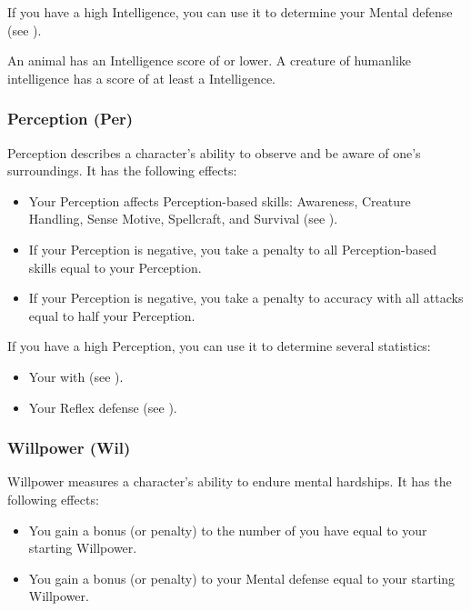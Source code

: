             If you have a high Intelligence, you can use it to determine your Mental defense (see ).

            \par An animal has an Intelligence score of  or lower.
            A creature of humanlike intelligence has a score of at least a  Intelligence.

        \subsubsection{Perception (Per)}\label{Perception}
            Perception describes a character's ability to observe and be aware of one's surroundings.
            It has the following effects:
            \begin{itemize}
                \item Your Perception affects Perception-based skills: Awareness, Creature Handling, Sense Motive, Spellcraft, and Survival (see ).
                \item If your Perception is negative, you take a penalty to all Perception-based skills equal to your Perception.
                \item If your Perception is negative, you take a penalty to accuracy with all attacks equal to half your Perception.
            \end{itemize}

            If you have a high Perception, you can use it to determine several statistics:
            \begin{itemize}
                \item Your  with  (see ).
                \item Your Reflex defense (see ).
            \end{itemize}

        \subsubsection{Willpower (Wil)}\label{Willpower}
            Willpower measures a character's ability to endure mental hardships.
            It has the following effects:
            \begin{itemize}
                \item You gain a bonus (or penalty) to the number of  you have equal to your starting Willpower.
                \item You gain a bonus (or penalty) to your Mental defense equal to your starting Willpower.
            \end{itemize}

